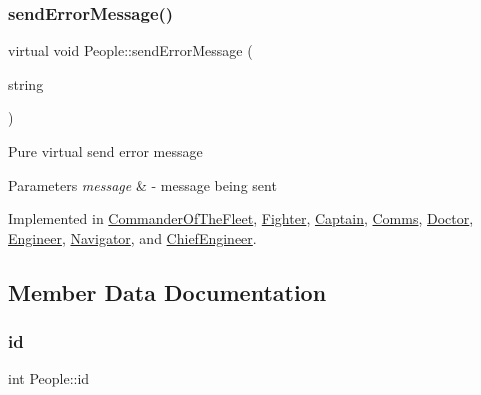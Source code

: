 \mbox{\label{classPeople_a572a35170f61d1848eb04b65baafb057}} 
\subsubsection{\texorpdfstring{send\+Error\+Message()}{sendErrorMessage()}}
{\footnotesize\ttfamily virtual void People\+::send\+Error\+Message (\begin{DoxyParamCaption}\item[{string}]{ }\end{DoxyParamCaption})\hspace{0.3cm}{\ttfamily [pure virtual]}}

Pure virtual send error message 
\begin{DoxyParams}{Parameters}
{\em message} & -\/ message being sent \\
\hline
\end{DoxyParams}


Implemented in \hyperlink{classCommanderOfTheFleet_a39cfd5c0016355543515e919791d7984}{Commander\+Of\+The\+Fleet}, \hyperlink{classFighter_a42b60e52427e5c69daf141351655805c}{Fighter}, \hyperlink{classCaptain_a88abc1940bcdef8a655efc20ebd68d50}{Captain}, \hyperlink{classComms_a23c37f6d10f06c7cfe25c4dc7d62fa12}{Comms}, \hyperlink{classDoctor_a5a524981ce52102f975cf9c569137ce5}{Doctor}, \hyperlink{classEngineer_ae60806f33b7f226891dbb7ad9b8a0c0b}{Engineer}, \hyperlink{classNavigator_a72ce12655f579879aae63b118c906b91}{Navigator}, and \hyperlink{classChiefEngineer_afe5a4677f7651fff2926c0583875a666}{Chief\+Engineer}.



\subsection{Member Data Documentation}
\mbox{\label{classPeople_ab8216a756c93da727d2626dfb063f82a}} 
\subsubsection{\texorpdfstring{id}{id}}
{\footnotesize\ttfamily int People\+::id\hspace{0.3cm}{\ttfamily [protected]}}

